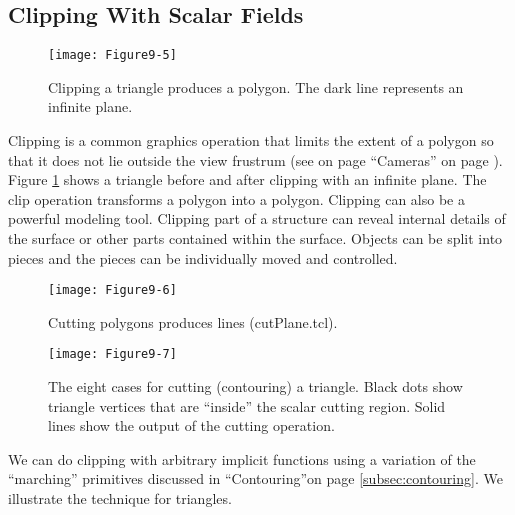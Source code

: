 \subsection{Clipping With Scalar Fields}
\label{subsec:clipping_with_scalar_fields}

\begin{figure}[!htb]
    \centering
    \texttt{[image: Figure9-5]}\\
    \caption{Clipping a triangle produces a polygon. The dark line represents an infinite plane.}\label{fig:Figure9-5}
\end{figure}


Clipping is a common graphics operation that limits the extent of a polygon so that it does not lie outside the view frustrum (see on page ``Cameras'' on page \pageref{sec:cameras}). Figure \ref{fig:Figure9-5} shows a triangle before and after clipping with an infinite plane. The clip operation transforms a polygon into a polygon. Clipping can also be a powerful modeling tool. Clipping part of a structure can reveal internal details of the surface or other parts contained within the surface. Objects can be split into pieces and the pieces can be individually moved and controlled.

\begin{figure}[!htb]
    \centering
    \texttt{[image: Figure9-6]}\\
    \caption{Cutting polygons produces lines (cutPlane.tcl).}\label{fig:Figure9-6}
\end{figure}

\begin{figure}[!htb]
    \centering
    \texttt{[image: Figure9-7]}\\
    \caption{The eight cases for cutting (contouring) a triangle. Black dots show triangle vertices that are ``inside'' the scalar cutting region. Solid lines show the output of the cutting operation.}\label{fig:Figure9-7}
\end{figure}

We can do clipping with arbitrary implicit functions using a variation of the ``marching'' primitives discussed in ``Contouring''on page \ref{subsec:contouring}. We illustrate the technique for triangles.

